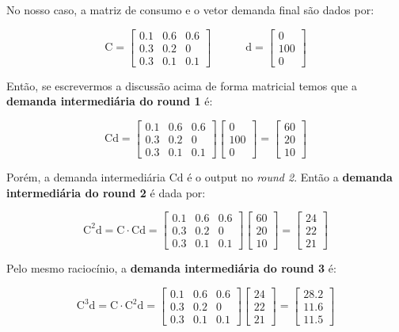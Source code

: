 \documentclass[a4paper, 12pt]{article}
\begin{document}
No nosso caso, a matriz de consumo e o vetor demanda final são dados por:

$$\mathrm{C}=\begin{bmatrix}
0.1&0.6&0.6\\
0.3&0.2&0\\
0.3&0.1&0.1
\end{bmatrix}\ \ \ \ \ \ \ \ \ \ \ \ \ \ \mathrm{d}=\begin{bmatrix}
0\\
100\\
0
\end{bmatrix}$$

Então, se escrevermos a discussão acima de forma matricial temos que a \textbf{demanda intermediária do round 1} é:

$$\mathrm{Cd}=\begin{bmatrix}
0.1&0.6&0.6\\
0.3&0.2&0\\
0.3&0.1&0.1
\end{bmatrix}\begin{bmatrix}
0\\
100\\
0
\end{bmatrix}=\begin{bmatrix}
60\\
20\\
10
\end{bmatrix}$$

Porém, a demanda intermediária $\mathrm{Cd}$ é o output no \textit{round 2}. Então a \textbf{demanda intermediária do round 2} é dada por:

$$\mathrm{C^2d}=\mathrm{C\cdot Cd}=\begin{bmatrix}
0.1&0.6&0.6\\
0.3&0.2&0\\
0.3&0.1&0.1
\end{bmatrix}\begin{bmatrix}
60\\
20\\
10
\end{bmatrix}=\begin{bmatrix}
24\\
22\\
21
\end{bmatrix}$$

Pelo mesmo raciocínio, a \textbf{demanda intermediária do round 3} é:

$$\mathrm{C^3d}=\mathrm{C\cdot C^2d}=\begin{bmatrix}
0.1&0.6&0.6\\
0.3&0.2&0\\
0.3&0.1&0.1
\end{bmatrix}\begin{bmatrix}
24\\
22\\
21
\end{bmatrix}=\begin{bmatrix}
28.2\\
11.6\\
11.5
\end{bmatrix}$$
\end{document}
